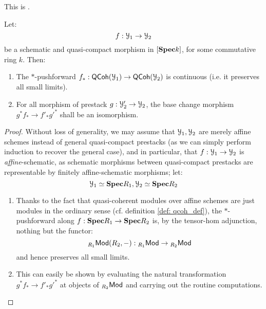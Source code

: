                 \begin{proposition} \label{prop: schematic_qc_base_change} 
                    This is \cite[Proposition I.2.2.2]{GR1}.
                    
                    Let:
                        $$f: \mathcal{Y}_1 \to \mathcal{Y}_2$$
                    be a schematic and quasi-compact morphism in $[\mathbf{Spec} k]$, for some commutative ring $k$. Then:
                        \begin{enumerate}
                            \item The $*$-pushforward $f_*: \mathsf{QCoh}(\mathcal{Y}_1) \to \mathsf{QCoh}(\mathcal{Y}_2)$ is continuous (i.e. it preserves all small limits).
                            \item For all morphism of prestack $g: \mathcal{Y}_2' \to \mathcal{Y}_2$, the base change morphism $g^* f_* \to f'_* g'^*$ shall be an isomorphism.
                        \end{enumerate}
                \end{proposition} 
                    \begin{proof}
                        Without loss of generality, we may assume that $\mathcal{Y}_1, \mathcal{Y}_2$ are merely affine schemes instead of general quasi-compact prestacks (as we can simply perform induction to recover the general case), and in particular, that $f: \mathcal{Y}_1 \to \mathcal{Y}_2$ is \textit{affine}-schematic, as schematic morphisms between quasi-compact prestacks are representable by finitely affine-schematic morphisms; let:
                            $$\mathcal{Y}_1 \simeq \mathbf{Spec} R_1, \mathcal{Y}_2 \simeq \mathbf{Spec} R_2$$
                            \begin{enumerate}
                                \item Thanks to the fact that quasi-coherent modules over affine schemes are just modules in the ordinary sense (cf. definition \ref{def: qcoh_def}), the $*$-pushforward along $f: \mathbf{Spec} R_1 \to \mathbf{Spec} R_2$ is, by the tensor-hom adjunction, nothing but the functor:
                                    $${}_{R_1}\mathsf{Mod}(R_2, -): {}_{R_1}\mathsf{Mod} \to {}_{R_2}\mathsf{Mod}$$
                                and hence preserves all small limits. 
                                \item This can easily be shown by evaluating the natural transformation $g^* f_* \to f'_* g'^*$ at objects of ${}_{R_2}\mathsf{Mod}$ and carrying out the routine computations.  
                            \end{enumerate}
                    \end{proof}
